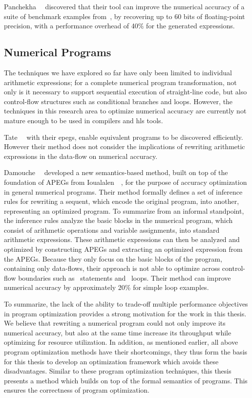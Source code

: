 Panchekha~\etal~\cite{panchekha15} discovered that their tool can improve the
numerical accuracy of a suite of benchmark examples from~\cite{hamming86},
by recovering up to 60 bits of floating-point precision, with a performance
overhead of 40\% for the generated expressions.


\subsection{Numerical Programs}
\label{bg:sub:numerical_programs}

The techniques we have explored so far have only been limited to individual
arithmetic expressions; for a complete numerical program transformation, not
only is it necessary to support sequential execution of straight-line code,
but also control-flow structures such as conditional branches and loops.
However, the techniques in this research area to optimize numerical accuracy
are currently not mature enough to be used in compilers and \gls{hls} tools.

Tate~\etal~\cite{tate09} with their \glspl{epeg}, enable equivalent programs
to be discovered efficiently.  However their method does not consider the
implications of rewriting arithmetic expressions in the data-flow on numerical
accuracy.

Damouche~\etal~\cite{damouche15} developed a new semantics-based method, built
on top of the foundation of APEGs from Ioualalen~\etal~\cite{ioualalen}, for
the purpose of accuracy optimization in general numerical programs.  Their
method formally defines a set of inference rules for rewriting a sequent,
which encode the original program, into another, representing an optimized
program.  To summarize from an informal standpoint, the inference rules
analyze the basic blocks in the numerical program, which consist of arithmetic
operations and variable assignments, into standard arithmetic expressions.
These arithmetic expressions can then be analyzed and optimized by constructing
APEGs and extracting an optimized expression from the APEGs.  Because they
only focus on the basic blocks of the program, containing only data-flows,
their approach is not able to optimize across control-flow boundaries such as
\iflit~statements and \whilelit~loops.  Their method can improve numerical
accuracy by approximately 20\% for simple loop examples.

To summarize, the lack of the ability to trade-off multiple performance
objectives in program optimization provides a strong motivation for the
work in this thesis.  We believe that rewriting a numerical program could
not only improve its numerical accuracy, but also at the same time increase
its throughput while optimizing for resource utilization.  In addition,
as mentioned earlier, all above program optimization methods have their
shortcomings, they thus form the basis for this thesis to develop an
optimization framework which avoids these disadvantages.  Similar to these
program optimization techniques, this thesis presents a method which builds
on top of the formal semantics of programs.  This ensures the correctness of
program optimization.


